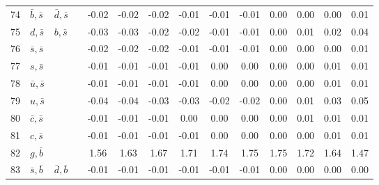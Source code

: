 \begin{tabularx}{\textwidth}{rXXX@{}S@{}S@{}S@{}S@{}S@{}S@{}S@{}S@{}S@{}S}
 74 & $\bar b, \bar s$ & $\bar d, \bar s$  &                  & -0.02 & -0.02 & -0.02 & -0.01 & -0.01 & -0.01 &  0.00 &  0.00 &  0.00 &  0.01 \\
 75 & $d, \bar s$      & $b, \bar s$       &                  & -0.03 & -0.03 & -0.02 & -0.02 & -0.01 & -0.01 &  0.00 &  0.01 &  0.02 &  0.04 \\
 76 & $\bar s, \bar s$ &                   &                  & -0.02 & -0.02 & -0.02 & -0.01 & -0.01 & -0.01 &  0.00 &  0.00 &  0.00 &  0.01 \\
 77 & $s, \bar s$      &                   &                  & -0.01 & -0.01 & -0.01 & -0.01 &  0.00 &  0.00 &  0.00 &  0.00 &  0.01 &  0.01 \\
 78 & $\bar u, \bar s$ &                   &                  & -0.01 & -0.01 & -0.01 & -0.01 &  0.00 &  0.00 &  0.00 &  0.00 &  0.01 &  0.01 \\
 79 & $u, \bar s$      &                   &                  & -0.04 & -0.04 & -0.03 & -0.03 & -0.02 & -0.02 &  0.00 &  0.01 &  0.03 &  0.05 \\
 80 & $\bar c, \bar s$ &                   &                  & -0.01 & -0.01 & -0.01 &  0.00 &  0.00 &  0.00 &  0.00 &  0.01 &  0.01 &  0.01 \\
 81 & $c, \bar s$      &                   &                  & -0.01 & -0.01 & -0.01 & -0.01 &  0.00 &  0.00 &  0.00 &  0.00 &  0.01 &  0.01 \\
 82 & $g, \bar b$      &                   &                  &  1.56 &  1.63 &  1.67 &  1.71 &  1.74 &  1.75 &  1.75 &  1.72 &  1.64 &  1.47 \\
 83 & $\bar s, \bar b$ & $\bar d, \bar b$  &                  & -0.01 & -0.01 & -0.01 & -0.01 & -0.01 & -0.01 &  0.00 &  0.00 &  0.00 &  0.00 \\
\bottomrule
\end{tabularx}







